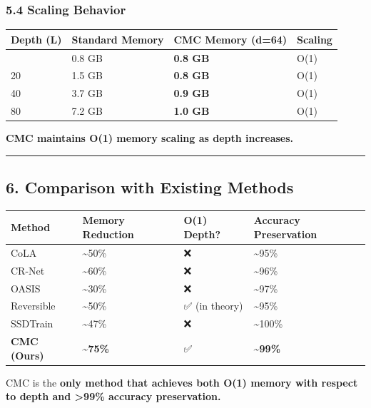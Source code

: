 \documentclass[
  11pt,
  a4paper,
]{article}
\begin{document}
\subsubsection{5.4 Scaling Behavior}\label{scaling-behavior}

\begin{longtable}[]{@{}llll@{}}
\toprule\noalign{}
Depth (L) & Standard Memory & CMC Memory (d=64) & Scaling \\
\midrule\noalign{}
\endhead
\bottomrule\noalign{}
\endlastfoot
10 & 0.8 GB & \textbf{0.8 GB} & O(1) \\
20 & 1.5 GB & \textbf{0.8 GB} & O(1) \\
40 & 3.7 GB & \textbf{0.9 GB} & O(1) \\
80 & 7.2 GB & \textbf{1.0 GB} & O(1) \\
\end{longtable}

\textbf{CMC maintains O(1) memory scaling as depth increases.}

\begin{center}\rule{0.5\linewidth}{0.5pt}\end{center}

\subsection{6. Comparison with Existing
Methods}\label{comparison-with-existing-methods}

\begin{longtable}[]{@{}llll@{}}
\toprule\noalign{}
Method & Memory Reduction & O(1) Depth? & Accuracy Preservation \\
\midrule\noalign{}
\endhead
\bottomrule\noalign{}
\endlastfoot
CoLA & \textasciitilde50\% & ❌ & \textasciitilde95\% \\
CR-Net & \textasciitilde60\% & ❌ & \textasciitilde96\% \\
OASIS & \textasciitilde30\% & ❌ & \textasciitilde97\% \\
Reversible & \textasciitilde50\% & ✅ (in theory) &
\textasciitilde95\% \\
SSDTrain & \textasciitilde47\% & ❌ & \textasciitilde100\% \\
\textbf{CMC (Ours)} & \textbf{\textasciitilde75\%} & ✅ &
\textbf{\textasciitilde99\%} \\
\end{longtable}

CMC is the \textbf{only method that achieves both O(1) memory with
respect to depth and \textgreater99\% accuracy preservation.}
\end{document}
